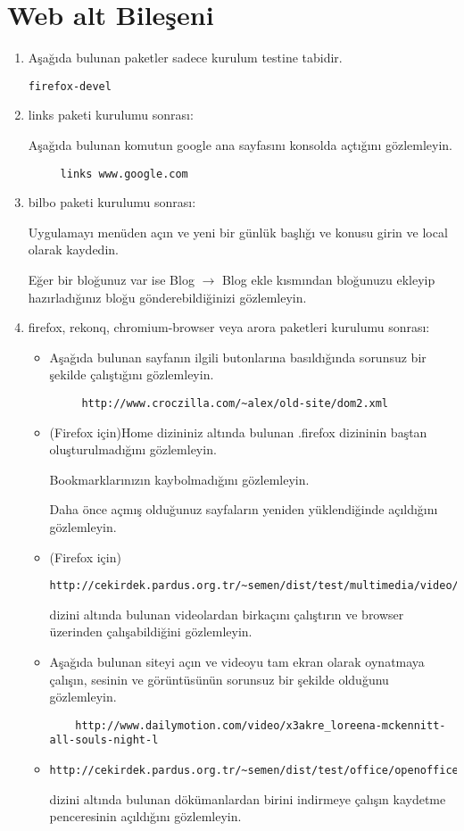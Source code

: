 \documentclass[a4paper,10pt]{article}
\begin{document}
\section{Web alt Bileşeni}
\begin{enumerate}
\item Aşağıda bulunan paketler sadece kurulum testine tabidir.
\begin{verbatim}
firefox-devel 
\end{verbatim}

\item links paketi kurulumu sonrası:

  Aşağıda bulunan komutun google ana sayfasını konsolda açtığını gözlemleyin.
	\begin{verbatim}
	 links www.google.com
	\end{verbatim}

\item bilbo paketi kurulumu sonrası:

Uygulamayı menüden açın ve yeni bir günlük başlığı ve konusu girin ve local olarak kaydedin. 

Eğer bir bloğunuz var ise Blog $\rightarrow$ Blog ekle kısmından bloğunuzu ekleyip hazırladığınız bloğu gönderebildiğinizi gözlemleyin.
\item firefox, rekonq, chromium-browser veya  arora paketleri kurulumu sonrası:
\begin{itemize}
 \item Aşağıda bulunan sayfanın ilgili butonlarına basıldığında sorunsuz bir şekilde çalıştığını gözlemleyin.
	\begin{verbatim}
	 http://www.croczilla.com/~alex/old-site/dom2.xml
	\end{verbatim}
 \item (Firefox için)Home dizininiz altında bulunan .firefox dizininin baştan oluşturulmadığını gözlemleyin.
	
	Bookmarklarınızın kaybolmadığını gözlemleyin.
	
 	Daha önce açmış olduğunuz sayfaların yeniden yüklendiğinde açıldığını gözlemleyin.
\item(Firefox için) \begin{verbatim}http://cekirdek.pardus.org.tr/~semen/dist/test/multimedia/video/cokluortam/\end{verbatim} dizini altında bulunan videolardan birkaçını çalıştırın ve browser üzerinden çalışabildiğini gözlemleyin.


\item Aşağıda bulunan siteyi açın ve videoyu tam ekran olarak oynatmaya çalışın, sesinin ve görüntüsünün sorunsuz bir şekilde olduğunu gözlemleyin.
	\begin{verbatim}
	http://www.dailymotion.com/video/x3akre_loreena-mckennitt-all-souls-night-l 
	\end{verbatim}
\item \begin{verbatim}http://cekirdek.pardus.org.tr/~semen/dist/test/office/openoffice/\end{verbatim} dizini altında bulunan dökümanlardan birini indirmeye çalışın kaydetme penceresinin açıldığını gözlemleyin.


\end{itemize}
\end{enumerate}
\end{document}
